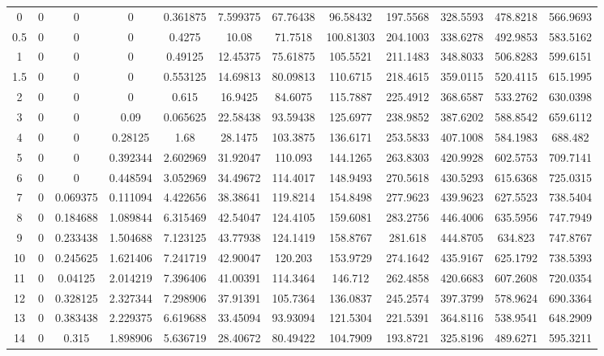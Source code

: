 \documentclass[12pt,a4paper,twoside]{report}
\begin{document}
\begin{table}[H]
{\begin{tabular}{c|ccccccccccc}
0    & 0 & 0 & 0 & 0.361875 & 7.599375 & 67.76438 & 96.58432 & 197.5568 & 328.5593 & 478.8218 & 566.9693 \\
0.5  & 0 & 0 & 0 & 0.4275   & 10.08    & 71.7518  & 100.81303 & 204.1003 & 338.6278 & 492.9853 & 583.5162 \\
1    & 0 & 0 & 0 & 0.49125  & 12.45375 & 75.61875 & 105.5521 & 211.1483 & 348.8033 & 506.8283 & 599.6151 \\
1.5  & 0 & 0 & 0 & 0.553125 & 14.69813 & 80.09813 & 110.6715 & 218.4615 & 359.0115 & 520.4115 & 615.1995 \\
2    & 0 & 0 & 0 & 0.615    & 16.9425  & 84.6075  & 115.7887 & 225.4912 & 368.6587 & 533.2762 & 630.0398 \\
3    & 0 & 0 & 0.09 & 0.065625 & 22.58438 & 93.59438 & 125.6977 & 238.9852 & 387.6202 & 588.8542 & 659.6112 \\
4    & 0 & 0 & 0.28125 & 1.68 & 28.1475 & 103.3875 & 136.6171 & 253.5833 & 407.1008 & 584.1983 & 688.482 \\
5    & 0 & 0 & 0.392344 & 2.602969 & 31.92047 & 110.093 & 144.1265 & 263.8303 & 420.9928 & 602.5753 & 709.7141 \\
6    & 0 & 0 & 0.448594 & 3.052969 & 34.49672 & 114.4017 & 148.9493 & 270.5618 & 430.5293 & 615.6368 & 725.0315 \\
7    & 0 & 0.069375 & 0.111094 & 4.422656 & 38.38641 & 119.8214 & 154.8498 & 277.9623 & 439.9623 & 627.5523 & 738.5404 \\
8    & 0 & 0.184688 & 1.089844 & 6.315469 & 42.54047 & 124.4105 & 159.6081 & 283.2756 & 446.4006 & 635.5956 & 747.7949 \\
9    & 0 & 0.233438 & 1.504688 & 7.123125 & 43.77938 & 124.1419 & 158.8767 & 281.618 & 444.8705 & 634.823 & 747.8767 \\
10   & 0 & 0.245625 & 1.621406 & 7.241719 & 42.90047 & 120.203 & 153.9729 & 274.1642 & 435.9167 & 625.1792 & 738.5393 \\
11   & 0 & 0.04125 & 2.014219 & 7.396406 & 41.00391 & 114.3464 & 146.712 & 262.4858 & 420.6683 & 607.2608 & 720.0354 \\
12   & 0 & 0.328125 & 2.327344 & 7.298906 & 37.91391 & 105.7364 & 136.0837 & 245.2574 & 397.3799 & 578.9624 & 690.3364 \\
13   & 0 & 0.383438 & 2.229375 & 6.619688 & 33.45094 & 93.93094 & 121.5304 & 221.5391 & 364.8116 & 538.9541 & 648.2909 \\
14   & 0 & 0.315 & 1.898906 & 5.636719 & 28.40672 & 80.49422 & 104.7909 & 193.8721 & 325.8196 & 489.6271 & 595.3211 \\

\end{tabular}}
\end{table}
\end{document}
